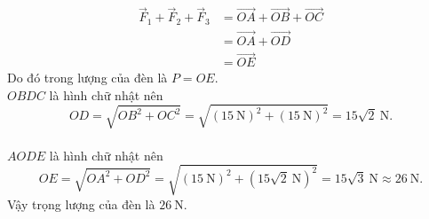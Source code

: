\begin{bt}
{\begin{align*}
			\overrightarrow{F}_1 + \overrightarrow{F}_2 + \overrightarrow{F}_3
			&= \overrightarrow{OA} + \overrightarrow{OB} + \overrightarrow{OC} \\
			&= \overrightarrow{OA} + \overrightarrow{OD} \\
			&= \overrightarrow{OE}
		\end{align*}
		Do đó trong lượng của đèn là $P=OE$.
		\\
		$OBDC$ là hình chữ nhật nên
		$$
		OD
		= \sqrt{OB^2 + OC^2}
		= \sqrt{\left(15~\text{N}\right)^2 + \left(15~\text{N}\right)^2}
		= 15\sqrt{2}~\text{N}.
		$$
		\\
		$AODE$ là hình chữ nhật nên
		$$
		OE
		= \sqrt{OA^2 + OD^2}
		= \sqrt{\left(15~\text{N}\right)^2 + \left(15\sqrt{2}~\text{N}\right)^2}
		= 15\sqrt{3}~\text{N}
		\approx 26~\text{N}.
		$$
		Vậy trọng lượng của đèn là $26~\text{N}$.
	}
\end{bt}

